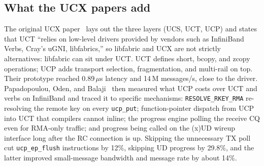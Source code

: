 \documentclass[11pt,letterpaper]{article}
\begin{document}
\begin{table}[ht]
\centering\small
{}
\caption{The three stacks, from~\cite{smith_mug23}, the UCX FAQ~\cite{ucx_faq}, and the DOCA documentation~\cite{doca}. Smith's summary: UCX is efficient for building HPC primitives and uses callbacks; libfabric is application-centric, offers more endpoint options, and is thread-safe by default; ``both provide very similar performance benefits.''}
\label{tab:stacks}
\end{table}

\subsection{What the UCX papers add}

The original UCX paper~\cite{shamis2015} lays out the three layers (UCS, UCT, UCP) and states that UCT ``relies on low-level drivers provided by vendors such as InfiniBand Verbs, Cray's uGNI, libfabrics,'' so libfabric and UCX are not strictly alternatives: libfabric can sit under UCT. UCT defines short, bcopy, and zcopy operations; UCP adds transport selection, fragmentation, and multi-rail on top. Their prototype reached 0.89\,$\mu$s latency and 14\,M messages/s, close to the driver. Papadopoulou, Oden, and Balaji~\cite{papadopoulou2017} then measured what UCP costs over UCT and verbs on InfiniBand and traced it to specific mechanisms: \texttt{RESOLVE\_RKEY\_RMA} re-resolving the remote key on every \texttt{ucp\_put}; function-pointer dispatch from UCP into UCT that compilers cannot inline; the progress engine polling the receive CQ even for RMA-only traffic; and progress being called on the (x)UD wireup interface long after the RC connection is up. Skipping the unnecessary TX poll cut \texttt{ucp\_ep\_flush} instructions by 12\%, skipping UD progress by 29.8\%, and the latter improved small-message bandwidth and message rate by about 14\%.
\end{document}
